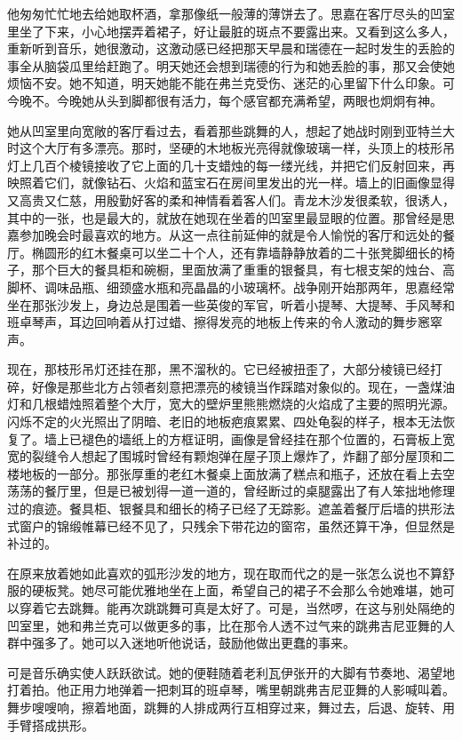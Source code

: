 \par 他匆匆忙忙地去给她取杯酒，拿那像纸一般薄的薄饼去了。思嘉在客厅尽头的凹室里坐了下来，小心地摆弄着裙子，好让最脏的斑点不要露出来。又看到这么多人，重新听到音乐，她很激动，这激动感已经把那天早晨和瑞德在一起时发生的丢脸的事全从脑袋瓜里给赶跑了。明天她还会想到瑞德的行为和她丢脸的事，那又会使她烦恼不安。她不知道，明天她能不能在弗兰克受伤、迷茫的心里留下什么印象。可今晚不。今晚她从头到脚都很有活力，每个感官都充满希望，两眼也炯炯有神。
\par 她从凹室里向宽敞的客厅看过去，看着那些跳舞的人，想起了她战时刚到亚特兰大时这个大厅有多漂亮。那时，坚硬的木地板光亮得就像玻璃一样，头顶上的枝形吊灯上几百个棱镜接收了它上面的几十支蜡烛的每一缕光线，并把它们反射回来，再映照着它们，就像钻石、火焰和蓝宝石在房间里发出的光一样。墙上的旧画像显得又高贵又仁慈，用殷勤好客的柔和神情看着客人们。青龙木沙发很柔软，很诱人，其中的一张，也是最大的，就放在她现在坐着的凹室里最显眼的位置。那曾经是思嘉参加晚会时最喜欢的地方。从这一点往前延伸的就是令人愉悦的客厅和远处的餐厅。椭圆形的红木餐桌可以坐二十个人，还有靠墙静静放着的二十张凳脚细长的椅子，那个巨大的餐具柜和碗橱，里面放满了重重的银餐具，有七根支架的烛台、高脚杯、调味品瓶、细颈盛水瓶和亮晶晶的小玻璃杯。战争刚开始那两年，思嘉经常坐在那张沙发上，身边总是围着一些英俊的军官，听着小提琴、大提琴、手风琴和班卓琴声，耳边回响着从打过蜡、擦得发亮的地板上传来的令人激动的舞步窸窣声。
\par 现在，那枝形吊灯还挂在那，黑不溜秋的。它已经被扭歪了，大部分棱镜已经打碎，好像是那些北方占领者刻意把漂亮的棱镜当作踩踏对象似的。现在，一盏煤油灯和几根蜡烛照着整个大厅，宽大的壁炉里熊熊燃烧的火焰成了主要的照明光源。闪烁不定的火光照出了阴暗、老旧的地板疤痕累累、四处龟裂的样子，根本无法恢复了。墙上已褪色的墙纸上的方框证明，画像是曾经挂在那个位置的，石膏板上宽宽的裂缝令人想起了围城时曾经有颗炮弹在屋子顶上爆炸了，炸翻了部分屋顶和二楼地板的一部分。那张厚重的老红木餐桌上面放满了糕点和瓶子，还放在看上去空荡荡的餐厅里，但是已被划得一道一道的，曾经断过的桌腿露出了有人笨拙地修理过的痕迹。餐具柜、银餐具和细长的椅子已经了无踪影。遮盖着餐厅后墙的拱形法式窗户的锦缎帷幕已经不见了，只残余下带花边的窗帘，虽然还算干净，但显然是补过的。
\par 在原来放着她如此喜欢的弧形沙发的地方，现在取而代之的是一张怎么说也不算舒服的硬板凳。她尽可能优雅地坐在上面，希望自己的裙子不会那么令她难堪，她可以穿着它去跳舞。能再次跳跳舞可真是太好了。可是，当然啰，在这与别处隔绝的凹室里，她和弗兰克可以做更多的事，比在那令人透不过气来的跳弗吉尼亚舞的人群中强多了。她可以入迷地听他说话，鼓励他做出更蠢的事来。
\par 可是音乐确实使人跃跃欲试。她的便鞋随着老利瓦伊张开的大脚有节奏地、渴望地打着拍。他正用力地弹着一把刺耳的班卓琴，嘴里朝跳弗吉尼亚舞的人影喊叫着。舞步嗖嗖响，擦着地面，跳舞的人排成两行互相穿过来，舞过去，后退、旋转、用手臂搭成拱形。
